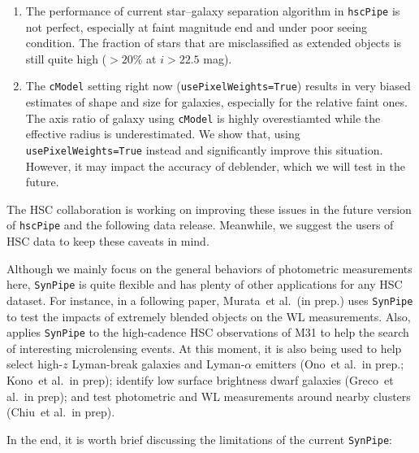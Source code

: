 \documentclass[useamsfonts]{pasj01}
\def\etal{{\ et al.~}}
\def\hscpipe{\texttt{hscPipe}}
\def\synpipe{\texttt{SynPipe}}
\def\cmodel{\texttt{cModel}}
\begin{document}
    \begin{enumerate}

        \item The performance of current star--galaxy separation algorithm in \hscpipe{}
            is not perfect, especially at faint magnitude end and under poor seeing
            condition.
            The fraction of stars that are misclassified as extended objects is still
            quite high ($>20$\% at $i> 22.5$ mag).

        \item The \cmodel{} setting right now (\texttt{usePixelWeights=True}) results
            in very biased estimates of shape and size for galaxies, especially for the
            relative faint ones.
            The axis ratio of galaxy using \cmodel{} is highly overestiamted while
            the effective radius is underestimated.
            We show that, using \texttt{usePixelWeights=True} instead and significantly
            improve this situation.
            However, it may impact the accuracy of deblender, which we will test in the
            future.

    \end{enumerate}

    The HSC collaboration is working on improving these issues in the future version
    of \hscpipe{} and the following data release.
    Meanwhile, we suggest the users of HSC data to keep these caveats in mind.

    Although we mainly focus on the general behaviors of photometric measurements here,
    \synpipe{} is quite flexible and has plenty of other applications for any HSC
    dataset.
    For instance, in a following paper, Murata\etal (in prep.) uses \synpipe{} to test
    the impacts of extremely blended objects on the WL measurements.
    Also, \citep{Niikura2017} applies \synpipe{} to the high-cadence HSC observations
    of M31 to help the search of interesting microlensing events.
    At this moment, it is also being used to help select high-$z$ Lyman-break galaxies
    and Lyman-$\alpha$ emitters (Ono\etal in prep.; Kono\etal in prep); identify
    low surface brightness dwarf galaxies (Greco\etal in prep); and test photometric
    and WL measurements around nearby clusters (Chiu\etal in prep).

    In the end, it is worth brief discussing the limitations of the current \synpipe{}:
\end{document}
